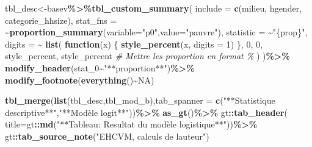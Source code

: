 \documentclass[
]{article}
\newenvironment{Shaded}{\begin{snugshade}}{\end{snugshade}}
\newcommand{\AttributeTok}[1]{\textcolor[rgb]{0.13,0.29,0.53}{#1}}
\newcommand{\CommentTok}[1]{\textcolor[rgb]{0.56,0.35,0.01}{\textit{#1}}}
\newcommand{\ConstantTok}[1]{\textcolor[rgb]{0.56,0.35,0.01}{#1}}
\newcommand{\ControlFlowTok}[1]{\textcolor[rgb]{0.13,0.29,0.53}{\textbf{#1}}}
\newcommand{\DecValTok}[1]{\textcolor[rgb]{0.00,0.00,0.81}{#1}}
\newcommand{\FunctionTok}[1]{\textcolor[rgb]{0.13,0.29,0.53}{\textbf{#1}}}
\newcommand{\NormalTok}[1]{#1}
\newcommand{\OtherTok}[1]{\textcolor[rgb]{0.56,0.35,0.01}{#1}}
\newcommand{\SpecialCharTok}[1]{\textcolor[rgb]{0.81,0.36,0.00}{\textbf{#1}}}
\newcommand{\StringTok}[1]{\textcolor[rgb]{0.31,0.60,0.02}{#1}}
\begin{document}
\begin{Shaded}
\begin{Highlighting}[]
\NormalTok{tbl\_desc}\OtherTok{\textless{}{-}}\NormalTok{basev}\SpecialCharTok{\%\textgreater{}\%}\FunctionTok{tbl\_custom\_summary}\NormalTok{(}
  \AttributeTok{include =} \FunctionTok{c}\NormalTok{(milieu, hgender, categorie\_hhsize),}
  \AttributeTok{stat\_fns =} \SpecialCharTok{\textasciitilde{}}\FunctionTok{proportion\_summary}\NormalTok{(}\AttributeTok{variable=}\StringTok{"p0"}\NormalTok{,}\AttributeTok{value=}\StringTok{"pauvre"}\NormalTok{),}
  \AttributeTok{statistic =} \SpecialCharTok{\textasciitilde{}}\StringTok{"\{prop\}"}\NormalTok{,}
  \AttributeTok{digits =} \SpecialCharTok{\textasciitilde{}} \FunctionTok{list}\NormalTok{(}
      \ControlFlowTok{function}\NormalTok{(x) \{}
        \FunctionTok{style\_percent}\NormalTok{(x, }\AttributeTok{digits =} \DecValTok{1}\NormalTok{)}
\NormalTok{      \},}
      \DecValTok{0}\NormalTok{, }\DecValTok{0}\NormalTok{, style\_percent, style\_percent}
      \CommentTok{\# Mettre les proportion en format \%}
\NormalTok{    )}
\NormalTok{)}\SpecialCharTok{\%\textgreater{}\%}
  \FunctionTok{modify\_header}\NormalTok{(stat\_0}\SpecialCharTok{\textasciitilde{}}\StringTok{"**proportion**"}\NormalTok{)}\SpecialCharTok{\%\textgreater{}\%}
  \FunctionTok{modify\_footnote}\NormalTok{(}\FunctionTok{everything}\NormalTok{()}\SpecialCharTok{\textasciitilde{}}\ConstantTok{NA}\NormalTok{)}
\end{Highlighting}
\end{Shaded}

\begin{Shaded}
\begin{Highlighting}[]
\FunctionTok{tbl\_merge}\NormalTok{(}\FunctionTok{list}\NormalTok{(tbl\_desc,tbl\_mod\_b),}\AttributeTok{tab\_spanner =} \FunctionTok{c}\NormalTok{(}\StringTok{"**Statistique }
\StringTok{                                                   descriptive**"}\NormalTok{,}\StringTok{"**Modèle logit**"}\NormalTok{))}\SpecialCharTok{\%\textgreater{}\%}
  \FunctionTok{as\_gt}\NormalTok{()}\SpecialCharTok{\%\textgreater{}\%}
\NormalTok{  gt}\SpecialCharTok{::}\FunctionTok{tab\_header}\NormalTok{(}
    \AttributeTok{title=}\NormalTok{gt}\SpecialCharTok{::}\FunctionTok{md}\NormalTok{(}\StringTok{"**Tableau: Resultat du modèle logistique**"}\NormalTok{))}\SpecialCharTok{\%\textgreater{}\%}
\NormalTok{  gt}\SpecialCharTok{::}\FunctionTok{tab\_source\_note}\NormalTok{(}\StringTok{"EHCVM, calculs de l\textquotesingle{}auteur"}\NormalTok{)}
\end{Highlighting}
\end{Shaded}
\end{document}
